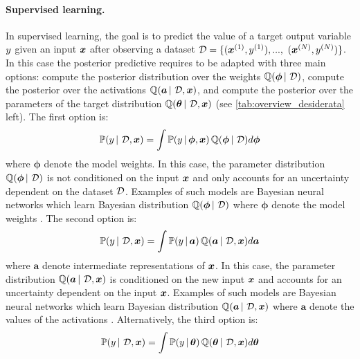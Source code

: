 \paragraph{Supervised learning.} In supervised learning, the goal is to predict the value of a target output variable $y$ given an input $\bm{x}$ after observing a dataset $\operatorname{\mathcal{D}}=\{(\bm{x}^{(1)}, y^{(1)}), ...,$ $(\bm{x}^{(N)}, y^{(N)})\}$.
In this case the posterior predictive requires to be adapted with three main options: compute the posterior distribution over the weights $\operatorname{\mathbb{Q}}(\bm{\phi} \,|\, \operatorname{\mathcal{D}})$, compute the posterior over the activations $\operatorname{\mathbb{Q}}(\bm{a} \,|\, \operatorname{\mathcal{D}}, \bm{x})$, and compute the posterior over the parameters of the target distribution $\operatorname{\mathbb{Q}}(\bm{\theta} \,|\, \operatorname{\mathcal{D}}, \bm{x})$ (see \cref{tab:overview_desiderata} left). The first option is:
\begin{equation}
    \label{eq:factorization_1}
    \mathbb{P}(y \,|\, \operatorname{\mathcal{D}}, \bm{x}) = \int \mathbb{P}(y \,|\, \bm{\phi}, \bm{x}) \operatorname{\mathbb{Q}}(\bm{\phi} \,|\, \operatorname{\mathcal{D}}) d\bm{\phi}
\end{equation}
where $\bm{\phi}$ denote the model weights. In this case, the parameter distribution $\operatorname{\mathbb{Q}}(\bm{\phi} \,|\, \operatorname{\mathcal{D}})$ is not conditioned on the input $\bm{x}$ and only accounts for an uncertainty dependent on the dataset $\operatorname{\mathcal{D}}$. Examples of such models are Bayesian neural networks which learn Bayesian distribution $\operatorname{\mathbb{Q}}(\bm{\phi} \,|\, \operatorname{\mathcal{D}})$ where $\bm{\phi}$ denote the model weights \cite{bayesian-networks}.
The second option is:
\begin{equation}
    \label{eq:factorization_2}
    \mathbb{P}(y \,|\, \operatorname{\mathcal{D}}, \bm{x}) = \int \mathbb{P}(y \,|\, \bm{a}) \operatorname{\mathbb{Q}}(\bm{a} \,|\, \operatorname{\mathcal{D}}, \bm{x}) d\bm{a}
\end{equation}
where $\bm{a}$ denote intermediate representations of $\bm{x}$. In this case, the parameter distribution $\operatorname{\mathbb{Q}}(\bm{a} \,|\, \operatorname{\mathcal{D}}, \bm{x})$ is conditioned on the new input $\bm{x}$ and accounts for an uncertainty dependent on the input $\bm{x}$. Examples of such models are Bayesian neural networks which learn Bayesian distribution $\operatorname{\mathbb{Q}}(\bm{a} \,|\, \operatorname{\mathcal{D}}, \bm{x})$ where $\bm{a}$ denote the values of the activations \cite{gp-uncertainty-activation,natural-parameter-network}.
Alternatively, the third option is:
\begin{equation}
    \label{eq:factorization_3}
    \mathbb{P}(y \,|\, \operatorname{\mathcal{D}}, \bm{x}) = \int \mathbb{P}(y \,|\, \bm{\theta}) \operatorname{\mathbb{Q}}(\bm{\theta} \,|\, \operatorname{\mathcal{D}}, \bm{x}) d\bm{\theta}
\end{equation}
